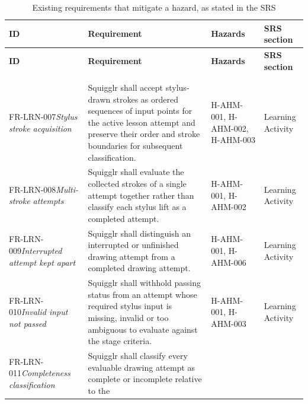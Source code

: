 \documentclass{article}
\begin{document}
{\footnotesize
\setlength{\tabcolsep}{4pt}
\begin{longtable}{@{}
  >{\raggedright\arraybackslash}p{2.1cm}
  >{\raggedright\arraybackslash}p{\dimexpr\linewidth-5.75cm-6\tabcolsep\relax}
  >{\raggedright\arraybackslash}p{1.75cm}
  >{\raggedright\arraybackslash}p{1.9cm}@{}}
\caption{Existing requirements that mitigate a hazard, as stated in the SRS}
\label{tab:existing-reqs}\\
\toprule
\textbf{ID} & \textbf{Requirement} & \textbf{Hazards} & \textbf{SRS section} \\
\midrule
\endfirsthead
\toprule
\textbf{ID} & \textbf{Requirement} & \textbf{Hazards} & \textbf{SRS section} \\
\midrule
\endhead
\midrule
\multicolumn{4}{@{}r@{}}{\emph{Continued on the next page}} \\
\endfoot
\bottomrule
\endlastfoot
\multicolumn{4}{@{}l}{\textbf{Functional requirements}} \\*
\addlinespace
FR-LRN-007\newline\emph{Stylus stroke acquisition} & Squigglr shall accept
stylus-drawn strokes as ordered sequences of input points for the active lesson
attempt and preserve their order and stroke boundaries for subsequent
classification. & H-AHM-001, H-AHM-002, H-AHM-003 & Learning Activity \\
\addlinespace
FR-LRN-008\newline\emph{Multi-stroke attempts} & Squigglr shall evaluate the
collected strokes of a single attempt together rather than classify each stylus
lift as a completed attempt. & H-AHM-001, H-AHM-002 & Learning Activity \\
\addlinespace
FR-LRN-009\newline\emph{Interrupted attempt kept apart} & Squigglr shall
distinguish an interrupted or unfinished drawing attempt from a completed
drawing attempt. & H-AHM-001, H-AHM-006 & Learning Activity \\
\addlinespace
FR-LRN-010\newline\emph{Invalid input not passed} & Squigglr shall withhold
passing status from an attempt whose required stylus input is missing, invalid
or too ambiguous to evaluate against the stage criteria. & H-AHM-001, H-AHM-003
& Learning Activity \\
\addlinespace
FR-LRN-011\newline\emph{Completeness classification} & Squigglr shall classify
every evaluable drawing attempt as complete or incomplete relative to the

\end{longtable}}
\end{document}
